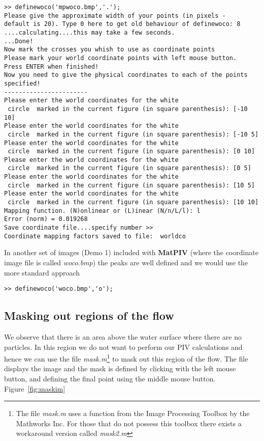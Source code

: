 \documentclass{book}
\begin{document}
\begin{verbatim}
>> definewoco('mpwoco.bmp','.');
Please give the approximate width of your points (in pixels -
default is 20). Type 0 here to get old behaviour of definewoco: 8
....calculating....this may take a few seconds.
...Done!
Now mark the crosses you whish to use as coordinate points
Please mark your world coordinate points with left mouse button.
Press ENTER when finished!
Now you need to give the physical coordinates to each of the points specified!
-----------------------
Please enter the world coordinates for the white 
 circle  marked in the current figure (in square parenthesis): [-10 10]
Please enter the world coordinates for the white 
 circle  marked in the current figure (in square parenthesis): [-10 5] 
Please enter the world coordinates for the white 
 circle  marked in the current figure (in square parenthesis): [0 10]  
Please enter the world coordinates for the white 
 circle  marked in the current figure (in square parenthesis): [0 5]   
Please enter the world coordinates for the white 
 circle  marked in the current figure (in square parenthesis): [10 5]
Please enter the world coordinates for the white 
 circle  marked in the current figure (in square parenthesis): [10 10]
Mapping function. (N)onlinear or (L)inear (N/n/L/l): l
Error (norm) = 0.019268
Save coordinate file....specify number >> 
Coordinate mapping factors saved to file:  worldco
\end{verbatim}



In another set of images (Demo 1) included with {\bf MatPIV} (where the
coordinate image file is called {\it woco.bmp}) the peaks are well
defined and we would use the more standard approach
\begin{verbatim}
>> definewoco('woco.bmp','o');
\end{verbatim}

\subsection{Masking out regions of the flow}
We observe that there is an area above the water surface where there
are no particles. In this region we do not want to perform our PIV
calculations and hence we can use the file {\it mask.m}\footnote{The
file {\it mask.m} uses a function from the Image Processing Toolbox by
the Mathworks Inc. For those that do not possess this toolbox there
exists a workaround version called {\it mask2.m}} to mask out this
region of the flow. The file displays the image and the mask is
defined by clicking with the left mouse button, and defining the final
point using the middle mouse button. Figure~\ref{fig:maskim}
\end{document}
